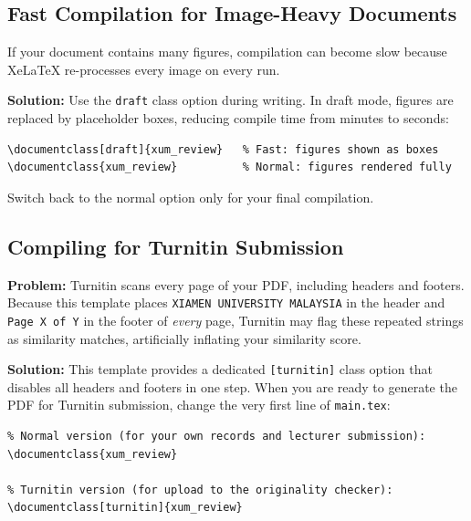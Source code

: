 \subsection{Fast Compilation for Image-Heavy Documents}

If your document contains many figures, compilation can become slow because
XeLaTeX re-processes every image on every run.

\textbf{Solution:} Use the \texttt{draft} class option during writing.
In draft mode, figures are replaced by placeholder boxes, reducing compile
time from minutes to seconds:

\begin{verbatim}
\documentclass[draft]{xum_review}   % Fast: figures shown as boxes
\documentclass{xum_review}          % Normal: figures rendered fully
\end{verbatim}

Switch back to the normal option only for your final compilation.

\subsection{Compiling for Turnitin Submission}

\textbf{Problem:} Turnitin scans every page of your PDF, including headers
and footers. Because this template places \texttt{XIAMEN UNIVERSITY MALAYSIA}
in the header and \texttt{Page X of Y} in the footer of \emph{every} page,
Turnitin may flag these repeated strings as similarity matches, artificially
inflating your similarity score.

\textbf{Solution:} This template provides a dedicated \texttt{[turnitin]}
class option that disables all headers and footers in one step.
When you are ready to generate the PDF for Turnitin submission, change the
very first line of \texttt{main.tex}:

\begin{verbatim}
% Normal version (for your own records and lecturer submission):
\documentclass{xum_review}

% Turnitin version (for upload to the originality checker):
\documentclass[turnitin]{xum_review}
\end{verbatim}

